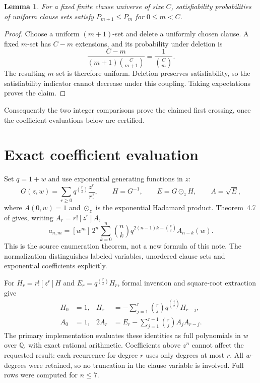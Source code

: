 \documentclass[11pt,a4paper]{article}
\newtheorem{lemma}[theorem]{Lemma}
\newcommand{\coeff}[1]{\left[#1\right]}
\begin{document}
\begin{lemma}
For a fixed finite clause universe of size $C$, satisfiability probabilities of
uniform clause sets satisfy $P_{m+1}\le P_m$ for $0\le m<C$.
\end{lemma}
\begin{proof}
Choose a uniform $(m+1)$-set and delete a uniformly chosen clause. A fixed $m$-set
has $C-m$ extensions, and its probability under deletion is
\[
\frac{C-m}{(m+1)\binom C{m+1}}=\frac1{\binom C m}.
\]
The resulting $m$-set is therefore uniform. Deletion preserves satisfiability,
so the satisfiability indicator cannot decrease under this coupling. Taking
expectations proves the claim.
\end{proof}
Consequently the two integer comparisons prove the claimed first crossing,
once the coefficient evaluations below are certified.

\section{Exact coefficient evaluation}
Set $q=1+w$ and use exponential generating functions in $z$:
\[
G(z,w)=\sum_{r\ge0}q^{\binom r2}\frac{z^r}{r!},\qquad
H=G^{-1},\qquad E=G\odot_z H,\qquad A=\sqrt E,
\]
where $A(0,w)=1$ and $\odot_z$ is the exponential Hadamard product. Theorem~4.7
of \cite{DPR} gives, writing $A_r=r!\coeff{z^r}A$,
\begin{equation}\label{eq:count}
a_{n,m}=\coeff{w^m}\,2^n\sum_{k=0}^n\binom nk
q^{2(n-1)k-\binom k2}A_{n-k}(w).
\end{equation}
This is the source enumeration theorem, not a new formula of this note.
The normalization distinguishes labeled variables, unordered clause sets and
exponential coefficients explicitly.

For $H_r=r!\coeff{z^r}H$ and $E_r=q^{\binom r2}H_r$, formal inversion and
square-root extraction give
\begin{align}
H_0&=1,& H_r&=-\sum_{j=1}^r\binom rj q^{\binom j2}H_{r-j},\label{eq:inv}\\
A_0&=1,&2A_r&=E_r-\sum_{j=1}^{r-1}\binom rj A_jA_{r-j}.\label{eq:sqrt}
\end{align}
The primary implementation evaluates these identities as full polynomials in
$w$ over $\mathbb Q$, with exact rational arithmetic. Coefficients above $z^n$
cannot affect the requested result: each recurrence for degree $r$ uses only
degrees at most $r$. All $w$-degrees were retained, so no truncation in the clause
variable is involved. Full rows were computed for $n\le7$.
\end{document}
